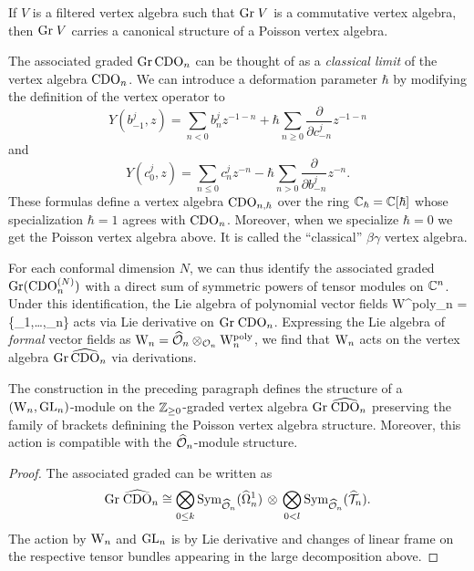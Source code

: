 \begin{prop}
If $V$ is a filtered vertex algebra such that ${\rm Gr} \; V$ is a commutative vertex algebra,
then ${\rm Gr} \; V$ carries a canonical structure of a Poisson vertex algebra.
\end{prop}

\begin{rmk} 
The associated graded ${\rm Gr}\, {\rm CDO}_n$ can be thought of as a {\em classical limit} of the vertex algebra ${\rm CDO}_n$. 
We can introduce a deformation parameter $\hbar$ by modifying the definition of the vertex operator to
\[
Y(b^j_{-1},z) = \sum_{n < 0} b_n^j z^{-1-n} + \hbar \sum_{n \ge 0} \frac{\partial}{\partial c_{-n}^j} z^{-1-n} 
\]
and 
\[
Y(c_{0}^j,z) = \sum_{n \le 0} c^j_n z^{-n} - \hbar \sum_{n > 0}  \frac{\partial}{\partial b_{-n}^j} z^{-n}.
\]
These formulas define a vertex algebra ${\rm CDO}_{n,\hbar}$ over the ring $\mathbb C_\hbar = \mathbb C [ \hbar]$ whose specialization $\hbar = 1$ agrees with ${\rm CDO}_n$. 
Moreover, when we specialize $\hbar = 0$ we get the Poisson vertex algebra above. 
It is called the ``classical'' $\beta\gamma$ vertex algebra.
\end{rmk}

For each conformal dimension $N$, we can thus identify the associated graded ${\rm Gr}({\rm CDO}_n^{(N)})$ with a direct sum of symmetric powers of tensor modules on $\mathbb C^n$. Under this identification, the Lie algebra of polynomial vector fields 
\ben
{\rm W}^{\rm poly}_n = \CC[t^1,\ldots,t^n]\{\partial_1,\ldots,\partial_n\}
\een
acts via Lie derivative on ${\rm Gr} \; {\rm CDO}_n$. Expressing the Lie algebra of
{\em formal} vector fields as ${{\rm W}_n} = \widehat{\mathcal O}_n \otimes_{\mathcal O_n} {\rm
  W}_n^{\rm poly}$, we find that ${{\rm W}_n}$ acts on the vertex algebra
${\rm Gr} \, \widehat{\rm CDO}_n$ via derivations.

\begin{prop} \label{grcdo}
The construction in the preceding paragraph defines the structure of a $({{\rm W}_n}, {\rm GL}_n)$-module on the $\mathbb Z_{\geq 0}$-graded vertex algebra ${\rm Gr} \; \widehat{\rm CDO}_n$ preserving the family of brackets definining the Poisson vertex algebra structure. Moreover, this action is compatible with the $\widehat{\mathcal O}_n$-module structure. 
\end{prop}

\begin{proof} The associated graded can be written as 
\[
{\rm Gr} \; \widehat{\rm CDO}_n \cong
\underset{{0\leq k}}{\bigotimes} \,{\rm Sym}_{\widehat{\mathcal O}_n}(\widehat{\Omega}^1_n)\,
\otimes \, \underset{{0<
    l}}{\bigotimes} \,{\rm Sym}_{\widehat{\mathcal O}_n}(\widehat{\mathcal T}_n) .
\]
The action by ${{\rm W}_n}$ and ${\rm GL}_n$ is by Lie derivative and changes of
linear
frame on the respective tensor
bundles appearing in the large decomposition above. 
\end{proof}

